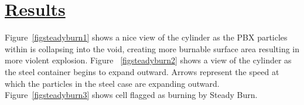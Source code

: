 \newpage

\section*{\underline{Results}}

Figure~\ref{figsteadyburn1} shows a nice view of the cylinder as the
PBX particles within is collapsing into the void, creating more
burnable surface area resulting in more violent explosion.  Figure
~\ref{figsteadyburn2} shows a view of the cylinder as the steel
container begins to expand outward.  Arrows represent the speed at
which the particles in the steel case are expanding outward.
Figure~\ref{figsteadyburn3} shows cell flagged as burning by Steady
Burn.








\begin{figure}
  \centering
  \vspace{-40pt}
  \hspace{10pt}
  \hspace{10pt}
  
  \caption{}
  \label{fig:mpmice2}
  

\end{figure}



